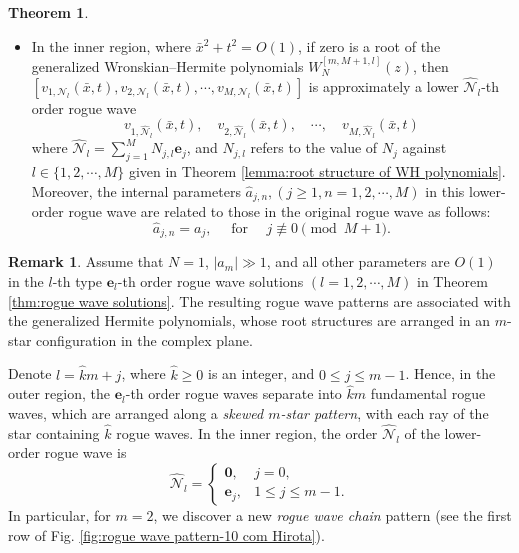 \documentclass[preprint,3p,10pt]{elsarticle}
\theoremstyle{definition}
\newtheorem{remark}{Remark}[section]
\newtheorem{theorem}{Theorem}[section]
\begin{document}
\begin{theorem}
\begin{itemize}
   \item [(2)]  In the inner
	region, where $\bar{x}^2+t^2=O(1)$,	 if zero is a root of the generalized Wronskian--Hermite polynomials $W_N^{[m,M+1,l]}(z)$, then $\left[ v_{1, \mathcal{N}_l}(\bar{x}, t), v_{2, \mathcal{N}_l}(\bar{x}, t), \cdots,  v_{M, \mathcal{N}_l }(\bar{x}, t)\right]$ is approximately a lower
	$\widehat{\mathcal{N}}_l$-th order rogue wave $$v_{1, \widehat{\mathcal{N}}_l}(\bar{x},
	t), \quad v_{2, \widehat{\mathcal{N}}_l}(\bar{x}, t), \quad \cdots, \quad
	v_{M, \widehat{\mathcal{N}}_l}(\bar{x}, t)$$
  where  $\widehat{\mathcal{N}}_l=\displaystyle{\sum_{j=1}^{M}N_{j,l}\mathbf{e}_j}$, and $N_{j,l}$ refers to the value of $N_j$ against $l \in \{1,2,\cdots,M\}$ given in Theorem \ref{lemma:root structure of WH polynomials}.  Moreover, the internal parameters $\hat{a}_{j,n}, (j\geq1, n=1,2,\cdots,M)$ in this lower-order rogue wave are related to those in the original rogue wave as follows:
  \begin{equation}
     \hat{a}_{j,n} = a_j, \quad\text{ for }\quad j \not \equiv 0  \pmod{M+1}.
  \end{equation}

 \end{itemize}

\end{theorem}

\begin{remark}\label{remark:rogue wave pattern associated with generalized Hermite poly}
Assume that $N=1$, $|a_m|\gg 1$, and all other parameters are $O(1)$ in the $l$-th type $\mathbf{e}_l$-th order rogue wave solutions $(l=1,2,\cdots,M)$ in Theorem \ref{thm:rogue wave solutions}. The resulting rogue wave patterns are associated with the generalized Hermite polynomials, whose root structures are arranged in an $m$-star configuration in the complex plane. 

Denote \( l=\hat{k}m+j \), where \( \hat{k}\ge 0 \) is an integer, and \( 0\le j\le m-1 \).
Hence, in the outer region, the $\mathbf{e}_l$-th order rogue waves separate into $\hat{k} m$ fundamental rogue waves, which are arranged along a \textit{skewed $m$-star pattern}, with each ray of the star containing $\hat{k}$ rogue waves.
In the inner region, the order $\widehat{\mathcal{N}}_l$ of the lower-order rogue wave is
\begin{equation}
\widehat{\mathcal N}_l
=
\begin{cases}
\mathbf 0, & j=0,\\
\mathbf e_j, & 1\le j\le m-1.
\end{cases}
\end{equation}
In particular, for $m=2$, we discover a new \textit{rogue wave chain} pattern (see the first row of Fig. \ref{fig:rogue wave pattern-10 com Hirota}).

\end{remark}
\end{document}
